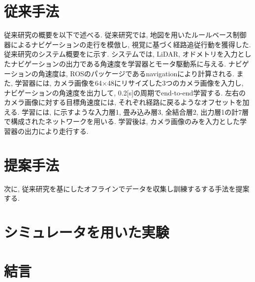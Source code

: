 \documentclass[10pt]{ujarticle}
\begin{document}
    \section{従来手法}%
    従来研究の概要を以下で述べる. 従来研究では, 地図を用いたルールベース制御器によるナビゲーションの走行を模倣し, 視覚に基づく経路追従行動を獲得した. 従来研究のシステム概要をに示す. システムでは, LiDAR, オドメトリを入力としたナビゲーションの出力である角速度を学習器とモータ駆動系に与える. ナビゲーションの角速度は, ROSのパッケージであるnavigationにより計算される. また, 学習器には, カメラ画像を64×48にリサイズした3つのカメラ画像を入力し, ナビゲーションの角速度を出力して, 0.2[s]の周期でend-to-end学習する. 左右のカメラ画像に対する目標角速度には, それぞれ経路に戻るようなオフセットを加える. 学習には, に示すような入力層1, 畳み込み層3, 全結合層2, 出力層1の計7層で構成されたネットワークを用いる. 学習後は, カメラ画像のみを入力とした学習器の出力により走行する. 


    \section{提案手法}%
    次に, 従来研究を基にしたオフラインでデータを収集し訓練するする手法を提案する. 

    \section{シミュレータを用いた実験}%
    
    \section{結\hspace{2zw}言}%
    
\end{document}
